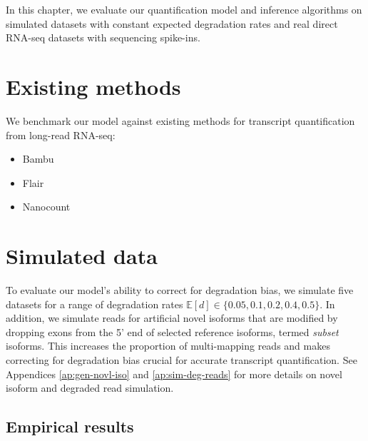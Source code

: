 
In this chapter, we evaluate our quantification model and inference algorithms on simulated datasets with constant expected degradation rates and real direct RNA-seq datasets with sequencing spike-ins. 

\section{Existing methods}

We benchmark our model against existing methods for transcript quantification from long-read RNA-seq:
\begin{itemize}
    \item Bambu
    \item Flair
    \item Nanocount
\end{itemize}

\section{Simulated data}

To evaluate our model's ability to correct for degradation bias, we simulate five datasets for a range of degradation rates $\mathbb{E}[d]\in\{0.05,0.1,0.2,0.4,0.5\}$. In addition, we simulate reads for artificial novel isoforms that are modified by dropping exons from the 5' end of selected reference isoforms, termed \textit{subset} isoforms. This increases the proportion of multi-mapping reads and makes correcting for degradation bias crucial for accurate transcript quantification. See Appendices \ref{ap:gen-novl-iso} and \ref{ap:sim-deg-reads} for more details on novel isoform and degraded read simulation. 

\subsection{Empirical results}

